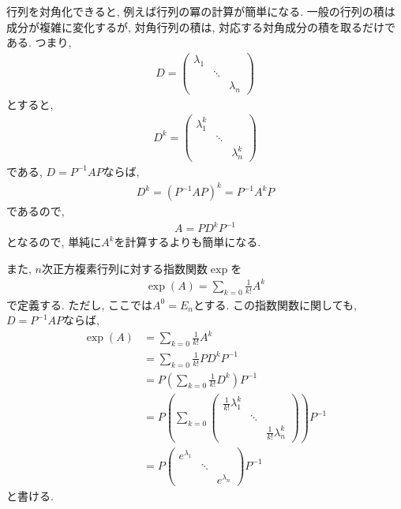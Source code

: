 行列を対角化できると,
例えば行列の冪の計算が簡単になる.
一般の行列の積は成分が複雑に変化するが,
対角行列の積は, 対応する対角成分の積を取るだけである.
つまり,
\begin{align*}
D=\begin{pmatrix}\lambda_1&&\\&\ddots&\\&&\lambda_n\end{pmatrix}
\end{align*}
とすると,
\begin{align*}
D^k=\begin{pmatrix}\lambda_1^k&&\\&\ddots&\\&&\lambda_n^k\end{pmatrix}
\end{align*}
である,
$D=P^{-1}AP$ならば,
\begin{align*}
  D^k=(P^{-1}AP)^k=P^{-1}A^kP
\end{align*}
であるので,
\begin{align*}
  A=PD^kP^{-1}
\end{align*}
となるので, 単純に$A^k$を計算するよりも簡単になる.

また, $n$次正方複素行列に対する指数関数$\exp$を
\begin{align*}
\exp(A)=\sum_{k=0}\frac{1}{k!}A^k
\end{align*}
で定義する.
ただし, ここでは$A^0=E_n$とする.
この指数関数に関しても,
$D=P^{-1}AP$ならば,
\begin{align*}
  \exp(A)&=\sum_{k=0}\frac{1}{k!}A^k\\
  &=\sum_{k=0}\frac{1}{k!}PD^kP^{-1}\\
  &=P(\sum_{k=0}\frac{1}{k!}D^k)P^{-1}\\
  &=P(\sum_{k=0}\begin{pmatrix}\frac{1}{k!}\lambda_1^k&&\\&\ddots&\\&&\frac{1}{k!}\lambda_n^k\end{pmatrix})P^{-1}\\
  &=P\begin{pmatrix}e^{\lambda_1}&&\\&\ddots&\\&&e^{\lambda_n}\end{pmatrix}P^{-1}
\end{align*}
と書ける.
